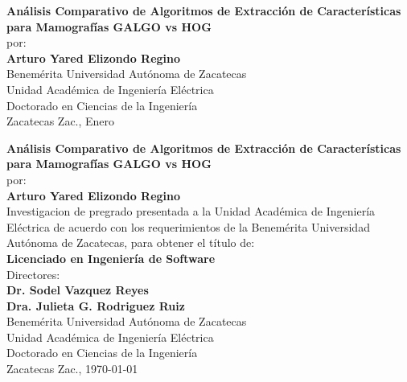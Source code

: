 \begin{center}
    \begin{figure}
    \centering%
    \end{figure}
    \thispagestyle{empty}
    \vspace*{1.0cm} \textbf{\huge
    Análisis Comparativo de Algoritmos de Extracción de Características para Mamografías GALGO vs HOG}\\[3.5cm]
    
    por:\\
    \Large\textbf{Arturo Yared Elizondo Regino}\\[3.0cm]
    \small Benemérita Universidad Autónoma de Zacatecas\\
     Unidad Académica de Ingeniería Eléctrica\\
    Doctorado en Ciencias de la Ingeniería\\
    Zacatecas Zac., Enero \the\year\\
    \end{center}
    
    \newpage
    \begin{center}
    \thispagestyle{empty} \vspace*{1cm} \textbf{\huge
    Análisis Comparativo de Algoritmos de Extracción de Características para Mamografías GALGO vs HOG}\\[2.0cm]por:\\
    
    \Large\textbf{Arturo Yared Elizondo Regino}\\[2.0cm]
    \small Investigacion de pregrado presentada a la Unidad Académica de Ingeniería Eléctrica de acuerdo con los requerimientos de la Benemérita Universidad 
    Autónoma de Zacatecas, para obtener el título de:\\ \textbf{Licenciado en Ingeniería de Software}
    \\[2.0cm]
    Directores:\\
    \textbf{Dr. Sodel Vazquez Reyes\\Dra. Julieta G. Rodriguez Ruiz} \\[2.0cm]
    
    Benemérita Universidad Autónoma de Zacatecas\\
    Unidad Académica de Ingeniería Eléctrica\\
    Doctorado en Ciencias de la Ingeniería\\
    Zacatecas Zac., \today \\
    \end{center}
